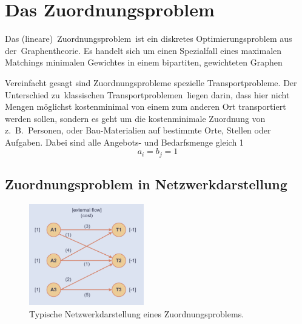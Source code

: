 %
%
%
\section{Das Zuordnungsproblem
\label{munkres:section:teil2}}
Das (lineare) Zuordnungsproblem ist ein diskretes Optimierungsproblem aus
der Graphentheorie.
Es handelt sich um einen Spezialfall eines maximalen Matchings
minimalen Gewichtes in einem bipartiten, gewichteten Graphen

Vereinfacht gesagt sind Zuordnungsprobleme spezielle Transportprobleme.
Der Unterschied zu klassischen Transportproblemen liegen darin,
dass hier nicht Mengen möglichst kostenminimal von einem zum anderen
Ort transportiert werden sollen, sondern es geht um die kostenminimale
Zuordnung von z.~B.~Personen, oder Bau-Materialien auf bestimmte
Orte, Stellen oder Aufgaben.
Dabei sind alle Angebots- und Bedarfsmenge gleich 1 
\begin{equation}
a_{i}=b_{j}=1
\end{equation}

\subsection{Zuordnungsproblem in Netzwerkdarstellung
\label{munkres:subsection:bonorum}}

\begin{figure}
\centering
\includegraphics[width=5cm]{papers/munkres/figures/Netzwerkdarstellung}
\caption{Typische Netzwerkdarstellung eines Zuordnungsproblems.}
\label{munkres:Vr2}
\end{figure}

